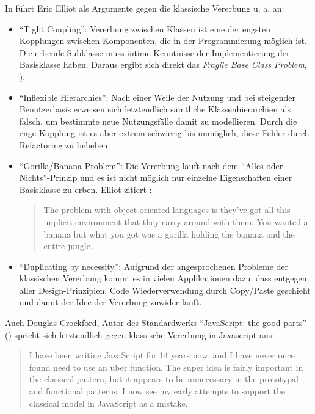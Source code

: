 In \citep[p. 48ff. "`Classical Inheritance Is Obsolete"']{ElliottProgrammingJavaScriptapplications2014} führt Eric Elliot als Argumente gegen die klassische Vererbung u. a. an:
\begin{itemize}
	\item "`Tight Coupling"': Vererbung zwischen Klassen ist eine der engsten Kopplungen zwischen Komponenten, die in der Programmierung möglich ist. Die erbende Subklasse muss intime Kenntnisse der Implementierung der Basisklasse haben. Daraus ergibt sich direkt das \emph{Fragile Base Class Problem}, \citep[§6.2]{Steimann.2010}).
	\item "`Inflexible Hierarchies"': Nach einer Weile der Nutzung und bei steigender Benutzerbasis erweisen sich letztendlich sämtliche Klassenhierarchien als falsch, um bestimmte neue Nutzungsfälle damit zu modellieren. Durch die enge Kopplung ist es aber extrem schwierig bis unmöglich, diese Fehler durch Refactoring zu beheben.
	\item "`Gorilla/Banana Problem"': Die Vererbung läuft nach dem "`Alles oder Nichts"'-Prinzip und es ist nicht möglich nur einzelne Eigenschaften einer Basisklasse zu erben. Elliot zitiert \citep{SeibelCodersworkreflections2009}: \begin{quote}
	The problem with object-oriented languages is they’ve got all this implicit environment
	that they carry around with them. You wanted a banana but what you got was a gorilla
	holding the banana and the entire jungle.
	\end{quote}
	\item "`Duplicating by necessity"': Aufgrund der angesprochenen Probleme der klassischen Vererbung kommt es in vielen Applikationen dazu, dass entgegen aller Design-Prinzipien, Code Wiederverwendung durch Copy/Paste geschieht und damit der Idee der Vererbung zuwider läuft. 
\end{itemize}

Auch Douglas Crockford, Autor des Standardwerks "`JavaScript: the good parts"' (\citep{CrockfordJavaScriptgoodparts2008}) spricht sich letztendlich gegen klassische Vererbung in Javascript aus: \begin{quote}
I have been writing JavaScript for 14 years now, and I have never once found need to use an uber function. The super idea is fairly important in the classical pattern, but it appears to be unnecessary in the prototypal and functional patterns. I now see my early attempts to support the classical model in JavaScript as a mistake. \citep{CrockfordClassicalInheritanceJavaScript}
\end{quote}


